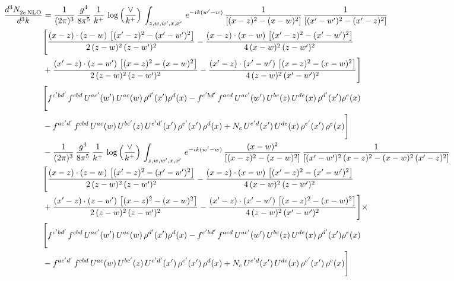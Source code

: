 \documentclass[9pt]{article}
\numberwithin{equation}{section}
\begin{document}
\begin{align}
 \frac{d^{3}N_{2e\,\rm NLO}^{\rm}}{d^{3}k}  & =  \frac{1}{(2\pi)^{3}}\, \frac{g^{4}}{8\pi^{5}}\,\frac{1}{k^{+}}\,\log{\left(\frac{\vee}{k^{+}}\right)}\,\int_{z,w,w^{\prime},x,x'}\, e^{-ik(w^{\prime}-w)}\, \frac{1}{\left[(x-z)^{2}-(x-w)^{2}\right]}\, \frac{1}{\left[(x'-w')^{2} - (x'-z)^{2}\right]} \notag \\ & \Bigg[\frac{(x-z)\cdot (z-w)\, \left[(x'-z)^{2}-(x'-w')^{2}\right]}{2\, (z-w)^{2}\, (z-w')^{2}}  - \frac{(x-z)\cdot (x-w)\,\left[(x'-z)^{2}-(x'-w')^{2}\right] }{4\,(x-w)^{2}\,(z-w')^{2}}\notag \\ & +\frac{(x'-z)\cdot (z-w')\, \left[(x-z)^{2}-(x-w)^{2}\right]}{2\, (z-w)^{2}\, (z-w')^{2}}-\frac{(x'-z)\cdot (x'-w')\, \left[(x-z)^{2}-(x-w)^{2}\right]}{4\, (z-w)^{2}\,(x'-w')^{2}}\Bigg]\notag \\ & \Bigg[f^{c'bd'}\,f^{cbd}\, U^{ac'}(w')\,U^{ac}(w)\,\rho^{d'}(x')\rho^{d}(x)- f^{c'bd'}\,f^{acd}\,U^{ac'}(w')\,U^{bc}(z)\,U^{de}(x)\,\rho^{d'}(x')\rho^{e}(x) \notag \\ & -f^{ac'd'}\,f^{cbd}\,U^{ac}(w)\,U^{bc'}(z)\,U^{e'd'}(x')\,\rho^{e'}(x')\,\rho^{d}(x) +N_{c}\,U^{e'd}(x')\,U^{de}(x)\,\rho^{e'}(x')\,\rho^{e}(x)\Bigg] \notag \\ & -\frac{1}{(2\pi)^{3}}\, \frac{g^{4}}{8\pi^{5}}\,\frac{1}{k^{+}}\,\log{\left(\frac{\vee}{k^{+}}\right)}\,\int_{z,w,w^{\prime},x,x'}\, e^{-ik(w^{\prime}-w)}\,\frac{(x-w)^{2}}{\left[(x-z)^{2}-(x-w)^{2}\right]}\, \frac{1}{\left[(x'-w')^{2}\, (x-z)^{2} - (x-w)^{2}\, (x'-z)^{2}\right]} \notag \\ & \Bigg[\frac{(x-z)\cdot (z-w)\, \left[(x'-z)^{2}-(x'-w')^{2}\right]}{2\, (z-w)^{2}\, (z-w')^{2}}  - \frac{(x-z)\cdot (x-w)\,\left[(x'-z)^{2}-(x'-w')^{2}\right] }{4\,(x-w)^{2}\,(z-w')^{2}}\notag \\ & +\frac{(x'-z)\cdot (z-w')\, \left[(x-z)^{2}-(x-w)^{2}\right]}{2\, (z-w)^{2}\, (z-w')^{2}}-\frac{(x'-z)\cdot (x'-w')\, \left[(x-z)^{2}-(x-w)^{2}\right]}{4\, (z-w)^{2}\,(x'-w')^{2}}\Bigg]\times\,\notag \\ & \Bigg[f^{c'bd'}\,f^{cbd}\, U^{ac'}(w')\,U^{ac}(w)\,\rho^{d'}(x')\rho^{d}(x)- f^{c'bd'}\,f^{acd}\,U^{ac'}(w')\,U^{bc}(z)\,U^{de}(x)\,\rho^{d'}(x')\rho^{e}(x) \notag \\ & -f^{ac'd'}\,f^{cbd}\,U^{ac}(w)\,U^{bc'}(z)\,U^{e'd'}(x')\,\rho^{e'}(x')\,\rho^{d}(x) +N_{c}\,U^{e'd}(x')\,U^{de}(x)\,\rho^{e'}(x')\,\rho^{e}(x)\Bigg] \notag \\

\end{align}
\end{document}
